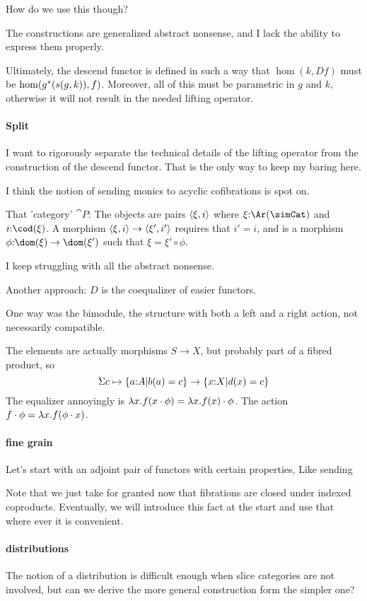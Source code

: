 \documentclass[csh.tex]{subfiles}
\begin{document}
How do we use this though?

The constructions are generalized abstract nonsense, and I lack the ability to express them properly. 

Ultimately, the descend functor is defined in such a way that $\hom(k, Df)$ must be $\hom(g^*(s(g,k)),f)$. Moreover, all of this must be parametric in $g$ and $k$, otherwise it will not result in the needed lifting operator.

\paragraph{Split}
I want to rigorously separate the technical details of the lifting operator from the construction of the descend functor. That is the only way to keep my baring here.

I think the notion of sending monics to acyclic cofibrations is spot on.

That 'category' $\cat P$:
The objects are pairs $\left\langle \xi,i \right\rangle$ where $\xi\of \Ar(\simCat)$ and $i\of\cod(\xi)$.
A morphism $\left\langle \xi,i \right\rangle\to \left\langle \xi',i' \right\rangle$ requires that $i'=i$, and is a morphism $\phi\of \dom(\xi)\to\dom(\xi')$ such that $\xi = \xi'\circ \phi$.

I keep struggling with all the abstract nonsense.

Another approach: $D$ is the coequalizer of easier functors. 

One way was the bimodule, the structure with both a left and a right action, not necessarily compatible.

The elements are actually morphisms $S \to X$, but probably part of a fibred product, so 
\[\Sigma c\mapsto {\left\{a\mathord :A|b(a) = c\right\} \to \left\{ x\mathord :X | d(x) = c\right\}}\]
The equalizer annoyingly is $\lambda x . {f(x\cdot \phi)} = \lambda x . f(x)\cdot \phi$. The action $f\cdot \phi = \lambda x .{f(\phi\cdot x)}$. 


\paragraph{fine grain}
Let's start with an adjoint pair of functors with certain properties,
Like sending 

Note that we just take for granted now that fibrations are closed under indexed coproducts. Eventually, we will introduce this fact at the start and use that where ever it is convenient.

\paragraph{distributions}
The notion of a distribution is difficult enough when slice categories are not involved, but can we derive the more general construction form the simpler one?
\end{document}

